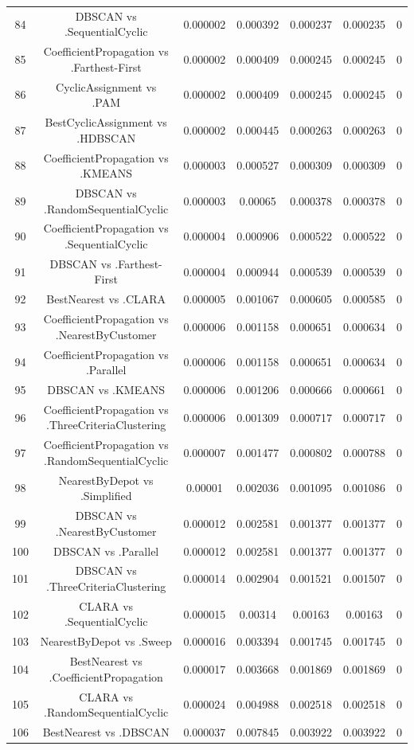 \documentclass[a4paper,10pt]{article}
\begin{document}
\begin{landscape}
\begin{table}[!htp]
\begin{tabular}{ccccccc}
84&DBSCAN vs .SequentialCyclic&0.000002&0.000392&0.000237&0.000235&0\\
85&CoefficientPropagation vs .Farthest-First&0.000002&0.000409&0.000245&0.000245&0\\
86&CyclicAssignment vs .PAM&0.000002&0.000409&0.000245&0.000245&0\\
87&BestCyclicAssignment vs .HDBSCAN&0.000002&0.000445&0.000263&0.000263&0\\
88&CoefficientPropagation vs .KMEANS&0.000003&0.000527&0.000309&0.000309&0\\
89&DBSCAN vs .RandomSequentialCyclic&0.000003&0.00065&0.000378&0.000378&0\\
90&CoefficientPropagation vs .SequentialCyclic&0.000004&0.000906&0.000522&0.000522&0\\
91&DBSCAN vs .Farthest-First&0.000004&0.000944&0.000539&0.000539&0\\
92&BestNearest vs .CLARA&0.000005&0.001067&0.000605&0.000585&0\\
93&CoefficientPropagation vs .NearestByCustomer&0.000006&0.001158&0.000651&0.000634&0\\
94&CoefficientPropagation vs .Parallel&0.000006&0.001158&0.000651&0.000634&0\\
95&DBSCAN vs .KMEANS&0.000006&0.001206&0.000666&0.000661&0\\
96&CoefficientPropagation vs .ThreeCriteriaClustering&0.000006&0.001309&0.000717&0.000717&0\\
97&CoefficientPropagation vs .RandomSequentialCyclic&0.000007&0.001477&0.000802&0.000788&0\\
98&NearestByDepot vs .Simplified&0.00001&0.002036&0.001095&0.001086&0\\
99&DBSCAN vs .NearestByCustomer&0.000012&0.002581&0.001377&0.001377&0\\
100&DBSCAN vs .Parallel&0.000012&0.002581&0.001377&0.001377&0\\
101&DBSCAN vs .ThreeCriteriaClustering&0.000014&0.002904&0.001521&0.001507&0\\
102&CLARA vs .SequentialCyclic&0.000015&0.00314&0.00163&0.00163&0\\
103&NearestByDepot vs .Sweep&0.000016&0.003394&0.001745&0.001745&0\\
104&BestNearest vs .CoefficientPropagation&0.000017&0.003668&0.001869&0.001869&0\\
105&CLARA vs .RandomSequentialCyclic&0.000024&0.004988&0.002518&0.002518&0\\
106&BestNearest vs .DBSCAN&0.000037&0.007845&0.003922&0.003922&0\\

\end{tabular}
\end{table}
\end{landscape}
\end{document}
